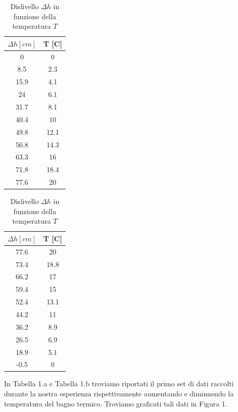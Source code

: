 \begin{table}[H]
\centering
	\begin{subtable}{.5\textwidth}
		\centering
		\begin{tabular}{|c|c|} \hline
			\textbf{$\Delta h {[cm]}$ } & \textbf{T {[\degree C]} }  \\ \hline
			0 & 0  \\ \hline
			8.5 & 2.3  \\ \hline
			15.9 & 4.1  \\ \hline
			24 & 6.1  \\ \hline
			31.7 & 8.1  \\ \hline
			40.4 & 10  \\ \hline
			49.8 & 12.1  \\ \hline
			56.8 & 14.3  \\ \hline
			63.3 & 16  \\ \hline
			71.8 & 18.4  \\ \hline
			77.6 & 20  \\ \hline
		\end{tabular}
		\caption{Aumento della temperatura }
	\end{subtable}%
	\begin{subtable}{.5\textwidth}
	\centering
	\begin{tabular}{|c|c|} \hline
		\textbf{$\Delta h {[cm]}$ } & \textbf{T {[\degree C]} }  \\ \hline
		77.6 & 20  \\ \hline
		73.4 & 18.8  \\ \hline
		66.2 & 17  \\ \hline
		59.4 & 15  \\ \hline
		52.4 & 13.1  \\ \hline
		44.2 & 11  \\ \hline
		36.2 & 8.9  \\ \hline
		26.5 & 6.9  \\ \hline
		18.9 & 5.1  \\ \hline
		-0.5 & 0  \\ \hline
	\end{tabular}
	\caption{Diminuzione della temperatura }
\end{subtable}

\caption{Dislivello $\Delta h$ in funzione della temperatura $T$ }
\end{table}
In Tabella 1.a e Tabella 1.b troviamo riportati il primo set di dati raccolti durante la nostra esperienza rispettivamente aumentando e diminuendo la temperatura del bagno termico.
Troviamo graficati tali dati in Figura 1. 

